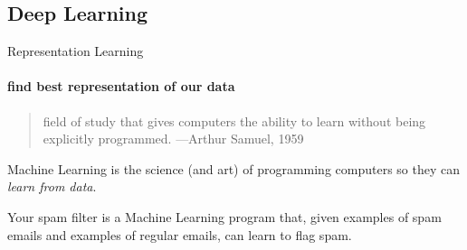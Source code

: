 \documentclass{beamer}
\begin{document}
    \subsection{Deep Learning}
    
    \begin{frame}[t]{Representation Learning}
      \framesubtitle{find best representation of our data}%
      \begin{quote}
        field of study that gives computers the ability to learn without being explicitly programmed.
        \hfill {\tiny —Arthur Samuel, 1959}
      \end{quote}
      Machine Learning is the science (and art) of programming computers so they can \textit{learn from data}. \\
      \vspace{8mm}
      \parbox{0.55\textwidth}{
      Your spam filter is a Machine Learning program that, given examples of spam emails and examples of regular emails, can learn to flag spam.
      }
    \end{frame}
\end{document}
